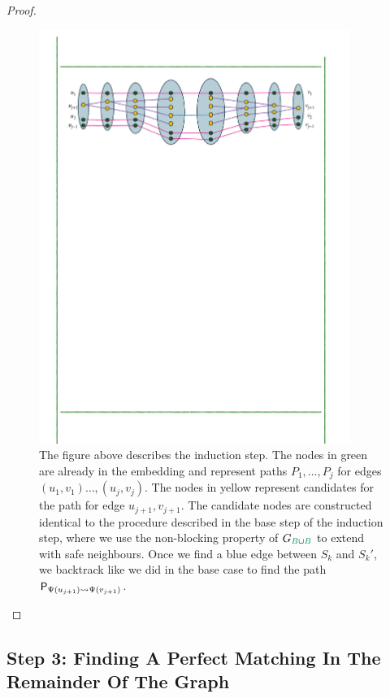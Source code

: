 \documentclass[11pt]{article}
\begin{document}
\begin{proof}
\begin{figure}
	\includegraphics[width=0.9\textwidth
	]{assets/InductionStep.pdf}
	\caption{The figure above describes the induction step. The nodes in green are already in the embedding and represent paths $P_1, \dots, P_j$ for edges $(u_1, v_1) \dots, (u_j, v_j)$.
	The nodes in yellow represent candidates for the path for edge $u_{j+1}, v_{j+1}$. 
	The candidate nodes are constructed identical to the procedure described in the base step of the induction step, where we use the non-blocking property of $\BipartiteG$ to extend with safe neighbours.
    Once we find a blue edge between $S_k$ and $S_k'$, we backtrack like we did in the base case to find the path $\mathsf{P}_{\Psi\left(u_{j+1}\right) \rightsquigarrow \Psi\left(v_{j+1}\right) }$.
	}
	\label{fig:induction}
\end{figure}

	
\end{proof}

\subsection{Step 3: Finding A Perfect Matching In The Remainder Of The Graph}
\end{document}
